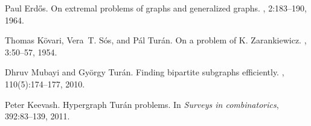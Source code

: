 \begin{thebibliography}{1}

Paul Erd\H{o}s.
\newblock On extremal problems of graphs and generalized graphs.
, 2:183--190, 1964.

Thomas K\"ovari, Vera~T. S\'os, and P{\'a}l Tur\'an.
\newblock On a problem of {K}. {Z}arankiewicz.
, 3:50--57, 1954.

Dhruv Mubayi and Gy\"{o}rgy {T}ur\'{a}n.
\newblock Finding bipartite subgraphs efficiently.
, 110(5):174--177, 2010.

Peter Keevash.
\newblock Hypergraph {T}ur\'{a}n problems.
\newblock In {\em Surveys in combinatorics}, 392:83--139, 2011.

\end{thebibliography}